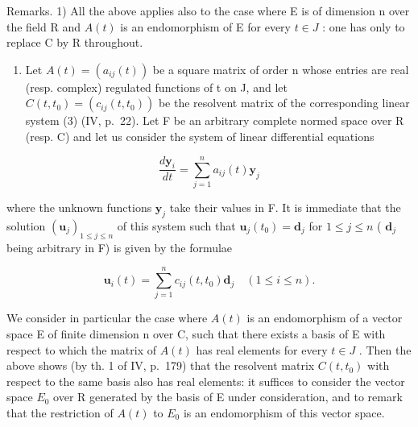 Remarks. 1) All the above applies also to the case where E is of dimension n over the field R and \(A(t)\) is an endomorphism of E for every \(t \in J\) : one has only to replace C by R throughout.

\begin{enumerate}
\def\labelenumi{\arabic{enumi})}
\setcounter{enumi}{1}
\tightlist
\item
  Let \(A(t) = (a_{ij}(t))\) be a square matrix of order n whose entries are real (resp. complex) regulated functions of t on J, and let \(C(t, t_0) = (c_{ij}(t, t_0))\) be the resolvent matrix of the corresponding linear system (3) (IV, p.~22). Let F be an arbitrary complete normed space over R (resp. C) and let us consider the system of linear differential equations
\end{enumerate}

\[
\frac {d \mathbf {y} _ {i}}{d t} = \sum_ {j = 1} ^ {n} a _ {i j} (t) \mathbf {y} _ {j}
\]

where the unknown functions \(\mathbf{y}_j\) take their values in F. It is immediate that the solution \((\mathbf{u}_j)_{1\leqslant j\leqslant n}\) of this system such that \(\mathbf{u}_j(t_0) = \mathbf{d}_j\) for \(1\leqslant j\leqslant n\) ( \(\mathbf{d}_j\) being arbitrary in F) is given by the formulae

\[
\mathbf {u} _ {i} (t) = \sum_ {j = 1} ^ {n} c _ {i j} (t, t _ {0}) \mathbf {d} _ {j} \quad (1 \leqslant i \leqslant n).
\]

We consider in particular the case where \(A(t)\) is an endomorphism of a vector space E of finite dimension n over C, such that there exists a basis of E with respect to which the matrix of \(A(t)\) has real elements for every \(t \in J\) . Then the above shows (by th. 1 of IV, p.~179) that the resolvent matrix \(C(t, t_{0})\) with respect to the same basis also has real elements: it suffices to consider the vector space \(E_{0}\) over R generated by the basis of E under consideration, and to remark that the restriction of \(A(t)\) to \(E_{0}\) is an endomorphism of this vector space.

